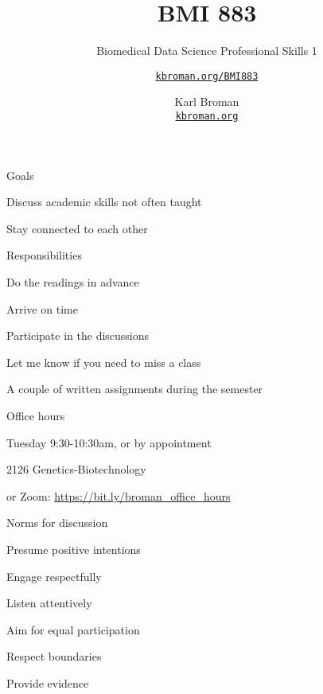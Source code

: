 \documentclass[aspectratio=169,12pt,t]{beamer}
\title{BMI 883}
\subtitle{Biomedical Data Science Professional Skills 1}
\author{\href{https://kbroman.org/BMI883}{\tt kbroman.org/BMI883} }
\institute{}
\date{\small \hspace{3in} Karl Broman \\
  \hspace{3in} \href{https://kbroman.org}{\color{foreground}
    \small \tt kbroman.org}}
\begin{document}
{
\frame{
  \titlepage
} }




\begin{frame}{Goals}

  \bbi
\item Discuss academic skills not often taught
\item Stay connected to each other
  \ei

\end{frame}




\begin{frame}{Responsibilities}

  \bbi
\item Do the readings in advance
\item Arrive on time
\item Participate in the discussions
\item Let me know if you need to miss a class
\item A couple of written assignments during the semester
  \ei

\end{frame}



\begin{frame}{Office hours}

  \bbi
\item Tuesday 9:30-10:30am, {\hilit or by appointment}
\item 2126 Genetics-Biotechnology
\item or Zoom: \url{https://bit.ly/broman_office_hours}
\ei

\end{frame}






\begin{frame}{Norms for discussion}

      \bbi
    \item Presume positive intentions
    \item Engage respectfully
    \item Listen attentively
    \item Aim for equal participation
    \item Respect boundaries
    \item Provide evidence
      \ei

\end{frame}
\end{document}
